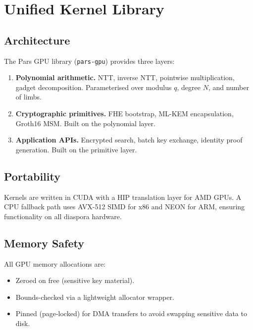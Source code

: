 \documentclass[11pt,a4paper]{article}
\begin{document}
\section{Unified Kernel Library}
\label{sec:library}

\subsection{Architecture}

The Pars GPU library (\texttt{pars-gpu}) provides three layers:

\begin{enumerate}
    \item \textbf{Polynomial arithmetic.}  NTT, inverse NTT, pointwise
    multiplication, gadget decomposition.  Parameterised over modulus $q$,
    degree $N$, and number of limbs.
    \item \textbf{Cryptographic primitives.}  FHE bootstrap, ML-KEM
    encapsulation, Groth16 MSM.  Built on the polynomial layer.
    \item \textbf{Application APIs.}  Encrypted search, batch key
    exchange, identity proof generation.  Built on the primitive layer.
\end{enumerate}

\subsection{Portability}

Kernels are written in CUDA with a HIP translation layer for AMD GPUs.
A CPU fallback path uses AVX-512 SIMD for x86 and NEON for ARM,
ensuring functionality on all diaspora hardware.

\subsection{Memory Safety}

All GPU memory allocations are:
\begin{itemize}
    \item Zeroed on free (sensitive key material).
    \item Bounds-checked via a lightweight allocator wrapper.
    \item Pinned (page-locked) for DMA transfers to avoid swapping
    sensitive data to disk.
\end{itemize}

\end{document}
